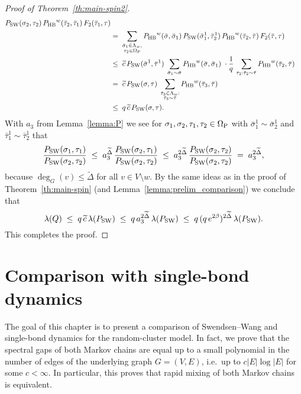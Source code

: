 \documentclass{dis}
\theoremstyle{citing}
\begin{document}
\begin{proof}[Proof of Theorem~\ref{th:main-spin2}]
\[\begin{split}
	{P_{\rm SW}}(\sigma_2,\tau_2)\,{P_{\rm HB}}^w(\bar\tau_2,\bar\tau_1)\,
	F_2(\bar\tau_1,\tau) \\
\;&=\; \sum_{\substack{\bar\sigma_1\in\Lambda_w,\\
								\tau_2\in{{\Omega}_{\rm P}}}}
	{P_{\rm HB}}^w(\bar\sigma,\bar\sigma_1)\,
	{P_{\rm SW}}(\bar\sigma_1^1,\bar\tau_2^1)\,{P_{\rm HB}}^w(\bar\tau_2,\bar\tau)\,
	F_2(\bar\tau,\tau) \\
&\le\; \widetilde{c}\,{P_{\rm SW}}(\bar\sigma^1,\bar\tau^1) \;
	\sum_{\bar\sigma_1\sim\bar\sigma} {P_{\rm HB}}^w(\bar\sigma,\bar\sigma_1)\;\cdot
	\frac{1}{q} \,
	\sum_{\tau_2:\bar\tau_2\sim\bar\tau} {P_{\rm HB}}^w(\bar\tau_2,\bar\tau) \\
&=\; \widetilde{c}\,{P_{\rm SW}}(\sigma,\tau) \;
	\sum_{\substack{\bar\tau_3\in\Lambda_w:\\
								\bar\tau_3\sim\bar\tau}} {P_{\rm HB}}^w(\bar\tau_3,\bar\tau)\\
\;&\le\; q\,\widetilde{c}\,{P_{\rm SW}}(\sigma,\tau).
\end{split}\]
With $a_3$ from Lemma~\ref{lemma:P} we see for 
$\sigma_1,\sigma_2,\tau_1,\tau_2\in{{\Omega}_{\rm P}}$ with 
$\bar\sigma_1^1\sim \bar\sigma_2^1$ and $\bar\tau_1^1\sim \bar\tau_2^1$ that
\[
\frac{{P_{\rm SW}}(\sigma_1,\tau_1)}{{P_{\rm SW}}(\sigma_2,\tau_2)}
\;\le\; a_3^{\widetilde{\Delta}}\,
	\frac{{P_{\rm SW}}(\sigma_2,\tau_1)}{{P_{\rm SW}}(\sigma_2,\tau_2)}
\;\le\; a_3^{2 \widetilde{\Delta}}\,
	\frac{{P_{\rm SW}}(\sigma_2,\tau_2)}{{P_{\rm SW}}(\sigma_2,\tau_2)} 
\;=\; a_3^{2 \widetilde{\Delta}}, 
\]
because $\deg_G(v)\le\widetilde{\Delta}$ for all $v\in V\setminus w$.
By the same ideas as in the proof of Theorem~\ref{th:main-spin} 
(and Lemma~\ref{lemma:prelim_comparison}) we conclude that 
\[
\lambda(Q) \;\le\; q\,\widetilde{c}\,\lambda({P_{\rm SW}})
\;\le\; q\,a_3^{2 \widetilde{\Delta}}\,\lambda({P_{\rm SW}})
\;\le\; q\,(q\,e^{2\beta})^{2 \widetilde{\Delta}}\,\lambda({P_{\rm SW}}).
\]
This completes the proof.
\end{proof}

\chapter{Comparison with single-bond dynamics}\label{chap:bond}

The goal of this chapter is to present a comparison of 
Swendsen--Wang and single-bond dynamics for the random-cluster model. 
In fact, we prove that the spectral gaps of both Markov chains are 
equal up to a small polynomial in the number of edges of the 
underlying graph $G=(V,E)$, i.e.~up to $c {\left\vert {E} \right\vert} \log{\left\vert {E} \right\vert}$ for 
some $c<\infty$. 
In particular, this proves that rapid mixing of both Markov chains 
is equivalent.
\end{document}
